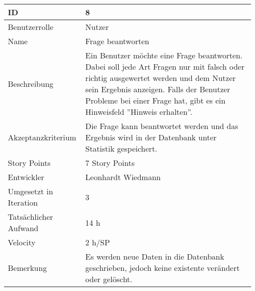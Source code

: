 \begin{tabularx}{\textwidth}{|p{}|X|}
	\hline
	ID & 8\\
	\hline
	Benutzerrolle & Nutzer\\
	\hline
	Name & Frage beantworten\\
	\hline
	Beschreibung & Ein Benutzer möchte eine Frage beantworten. Dabei soll jede Art Fragen nur mit falsch oder richtig ausgewertet werden und dem Nutzer sein Ergebnis anzeigen. Falls der Benutzer Probleme bei einer Frage hat, gibt es ein Hinweisfeld ''Hinweis erhalten''.\\
	\hline
	Akzeptanzkriterium & Die Frage kann beantwortet werden und das Ergebnis wird in der Datenbank unter Statistik gespeichert.\\
	\hline
	Story Points & 7 Story Points\\
	\hline
	Entwickler & Leonhardt Wiedmann\\
	\hline
	Umgesetzt in Iteration & 3\\
	\hline
	Tatsächlicher Aufwand & 14 h\\
	\hline
	Velocity & 2 h/SP\\
	\hline
	Bemerkung & Es werden neue Daten in die Datenbank geschrieben, jedoch keine existente verändert oder gelöscht.\\
	\hline
\end{tabularx}
\vspace{20pt}
